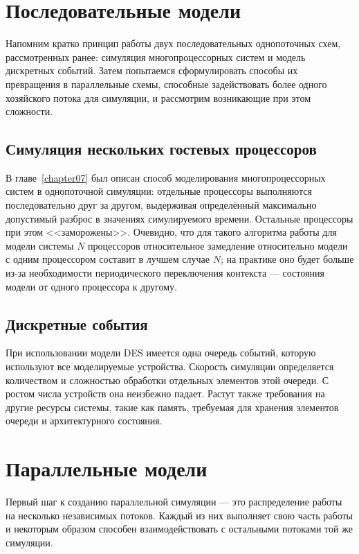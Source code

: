 \section{Последовательные модели}

Напомним кратко принцип работы двух последовательных однопоточных схем, рассмотренных ранее: симуляция многопроцессорных систем и модель дискретных событий. Затем попытаемся сформулировать способы их превращения в параллельные схемы, способные задействовать более одного хозяйского потока для симуляции, и рассмотрим возникающие при этом сложности.

\subsection{Симуляция нескольких гостевых процессоров}

В главе~\ref{chapter07} был описан способ моделирования многопроцессорных систем в однопоточной симуляции: отдельные процессоры выполняются последовательно друг за другом, выдерживая определённый максимально допустимый разброс в значениях симулируемого времени. Остальные процессоры при этом <<заморожены>>. Очевидно, что для такого алгоритма работы для модели системы $N$ процессоров относительное замедление относительно модели с одним процессором составит в лучшем случае $N$; на практике оно будет больше из-за необходимости периодического переключения контекста --- состояния модели от одного процессора к другому.

\subsection{Дискретные события}

При использовании модели DES имеется одна очередь событий, которую используют все моделируемые устройства. Скорость симуляции определяется количеством и сложностью обработки отдельных элементов этой очереди. С ростом числа устройств она неизбежно падает. Растут также требования на другие ресурсы системы, такие как память, требуемая для хранения элементов очереди и архитектурного состояния.

\section{Параллельные модели}

Первый шаг к созданию параллельной симуляции --- это распределение работы на несколько независимых потоков. Каждый из них выполняет свою часть работы и некоторым образом способен взаимодействовать с остальными потоками той же симуляции. 

